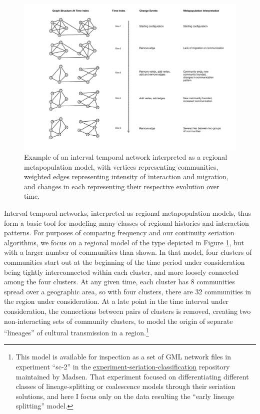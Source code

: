 \documentclass[graybox,natbib]{svmult}
\begin{document}
\begin{figure}[ht]
\centering
\includegraphics[scale=0.25]{interval-temporal-network-with-interpretation.pdf}
\caption{Example of an interval temporal network interpreted as a regional metapopulation model, with vertices representing communities, weighted edges representing intensity of interaction and migration, and changes in each representing their respective evolution over time.}
\label{img:itn-example}
\end{figure}

Interval temporal networks, interpreted as regional metapopulation
models, thus form a basic tool for modeling many classes of regional
histories and interaction patterns. For purposes of comparing frequency
and our continuity seriation algorithms, we focus on a regional model of
the type depicted in Figure \ref{img:itn-example}, but with a larger
number of communities than shown. In that model, four clusters of
communities start out at the beginning of the time period under
consideration being tightly interconnected within each cluster, and more
loosely connected among the four clusters. At any given time, each
cluster has 8 communities spread over a geographic area, so with four
clusters, there are 32 communities in the region under consideration. At
a late point in the time interval under consideration, the connections
between pairs of clusters is removed, creating two non-interacting sets
of community clusters, to model the origin of separate ``lineages'' of
cultural transmission in a region.\footnote{This model is available for
  inspection as a set of GML network files in experiment ``sc-2'' in the
  \href{https://github.com/mmadsen/experiment-seriation-classification}{experiment-seriation-classification}
  repository maintained by Madsen. That experiment focused on
  differentiating different classes of lineage-splitting or coalescence
  models through their seriation solutions, and here I focus only on the
  data resulting the ``early lineage splitting'' model.}
\end{document}
